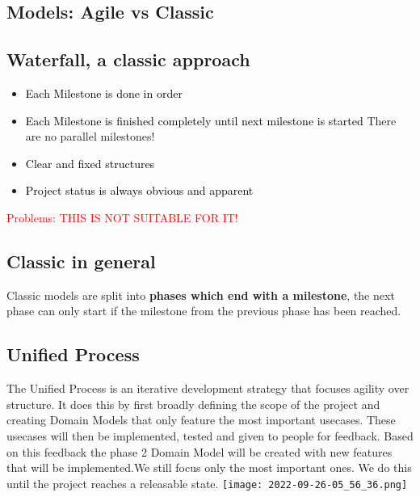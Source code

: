 \documentclass[main.tex,fontsize=12pt,paper=a4,paper=landscape,DIV=calc,]{scrartcl}
\begin{document}
\begin{multicols*}{2}
\section{Models: Agile vs Classic}
\subsection{Waterfall, a classic approach}
\begin{itemize}
\item \textcolor{black}{Each Milestone is done in order}
\item \textcolor{black}{Each Milestone is finished completely until next milestone is started}\newline
  There are no parallel milestones!
\item \textcolor{black}{Clear and fixed structures}
\item \textcolor{black}{Project status is always obvious and apparent}
\end{itemize} 
\textcolor{red}{Problems: THIS IS NOT SUITABLE FOR IT!}

\subsection{Classic in general}
Classic models are split into \textbf{phases which end with a milestone}, the next phase can only start if the milestone from the previous phase has been reached. 

\subsection{Unified Process}
The Unified Process is an iterative development strategy that focuses agility over structure.\newline
It does this by first broadly defining the scope of the project and creating Domain Models that only feature the most important usecases.
These usecases will then be implemented, tested and given to people for feedback.\newline
Based on this feedback the phase 2 Domain Model will be created with new features that will be implemented.\newline We still focus only the most important ones.\newline
We do this until the project reaches a releasable state.\newline
\texttt{[image: 2022-09-26-05\_56\_36.png]}


\end{multicols*}
\end{document}
